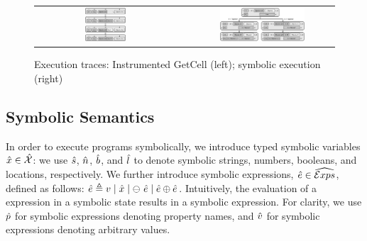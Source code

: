 \begin{figure}[!t]
\centering
\begin{tabular}{c||c}
\includegraphics[width=0.29\textwidth]{figures/domaintable.png} \ & \ \includegraphics[width=0.6\textwidth]{figures/symbSemEx.png}
\end{tabular}
\vspace*{-0.3cm}
\caption{Execution traces: Instrumented GetCell (left); \cosette symbolic execution (right)}
\label{fig:sexecexample}
\vspace*{-0.4cm}
\end{figure}

\vspace*{-0.2cm}
\subsection{Symbolic Semantics}\label{subsec:symb:semantics}
In order to execute \jsil programs symbolically, we introduce typed symbolic variables $\hat{x} \in \hat{\mathcal{X}}$: 
we use $\hat{s}$, $\hat{n}$, $\hat{b}$, and $\hat{l}$ to denote symbolic strings, numbers, 
booleans, and locations, respectively. We further introduce symbolic expressions, $\hat{e} \in \widehat{\text{$\mathcal{E}xps$}}$, defined as follows: 
$\hat{e} \triangleq v \mid \hat{x} \mid \ominus\ \hat{e} \mid \hat{e} \oplus \hat{e}$. 
Intuitively, the evaluation of a \jsil expression in a symbolic state results in a symbolic expression. 
For clarity, we use $\hat{p}$ for symbolic expressions denoting property names, and $\hat{v}$ for symbolic
expressions denoting arbitrary values. 


